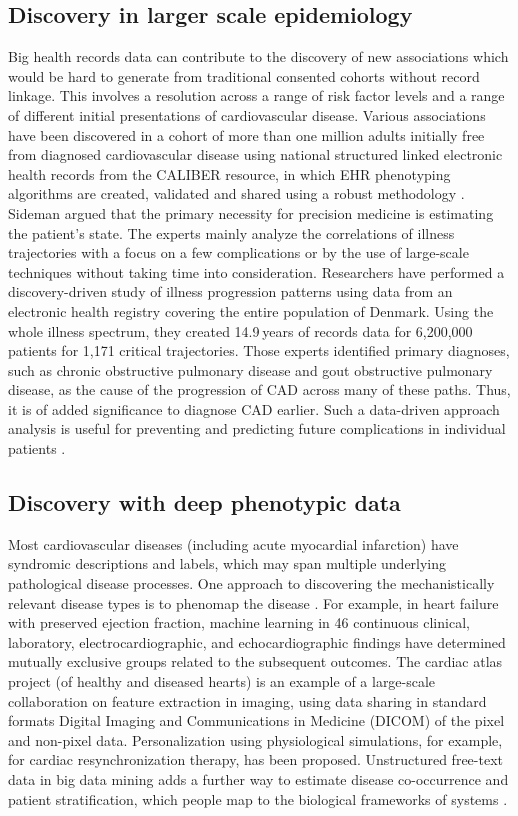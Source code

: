 \documentclass[sigconf]{acmart}
\begin{document}
\subsection{Discovery in larger scale epidemiology}
Big health records data can contribute to the discovery of new associations which would be hard to generate from traditional consented cohorts without record linkage.
 This involves a resolution across a range of risk factor levels and a range of different initial presentations of cardiovascular disease.
Various associations have been  discovered in a cohort of  more than one million adults initially free from diagnosed cardiovascular disease using national structured linked electronic health records from the CALIBER resource, in which EHR phenotyping algorithms are created, validated and shared using a robust methodology \cite{wang2005framingham}.
Sideman \cite{sideman1985simulation} argued that the primary necessity for precision medicine is estimating the patient's state.
The experts mainly analyze the correlations of illness trajectories with a focus on a few complications or by the use of large-scale techniques without taking time into consideration.
Researchers have performed a discovery-driven study of illness progression patterns using data from an electronic health registry covering the entire population of Denmark.
Using the whole illness spectrum, they created 14.9 years of records data for 6,200,000 patients for 1,171 critical trajectories.  Those experts identified primary diagnoses, such as chronic obstructive pulmonary disease and gout obstructive pulmonary disease, as the cause of the progression of CAD across many of these paths. Thus, it is of added significance to diagnose CAD earlier.
Such a data-driven approach analysis is useful for preventing and predicting future complications in individual patients \cite{sideman1985simulation}.

\subsection{Discovery with deep phenotypic data}
Most cardiovascular diseases (including acute myocardial infarction) have syndromic descriptions and labels, which may span multiple underlying pathological disease processes.
One approach to discovering the mechanistically relevant disease types is to phenomap the disease \cite{sahaf2011comparing}.
For example, in heart failure with preserved ejection fraction, machine learning in 46 continuous clinical, laboratory, electrocardiographic, and echocardiographic findings have determined mutually exclusive groups related to the subsequent outcomes.
The cardiac atlas project (of healthy and diseased hearts) is an example of a large-scale collaboration on feature extraction in imaging, using data sharing in standard formats Digital Imaging and Communications in Medicine (DICOM) of the pixel and non-pixel data.
Personalization using physiological simulations, for example, for cardiac resynchronization therapy, has been proposed.
Unstructured free-text data in big data mining adds a further way to estimate disease co-occurrence and patient stratification, which people map to the biological frameworks of systems \cite{sahaf2011comparing}.
\end{document}
